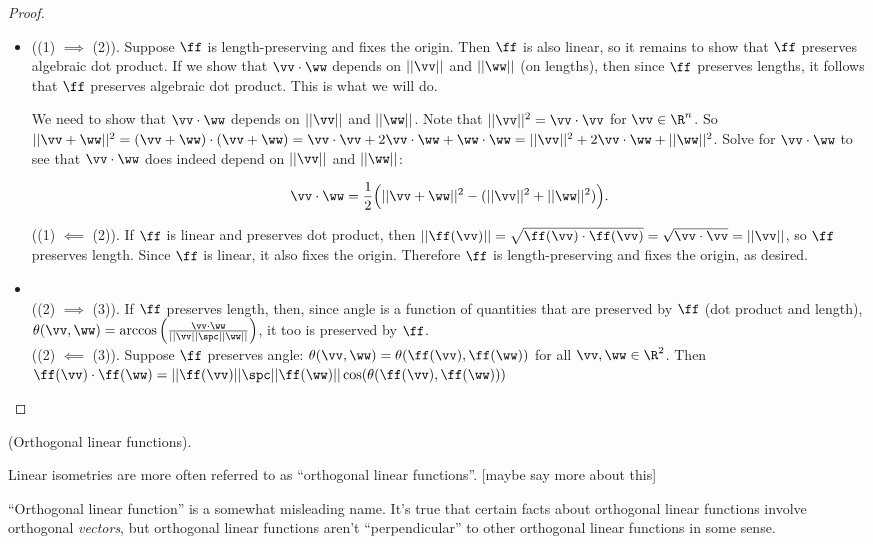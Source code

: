 \begin{proof}
    \mbox{} \\
    \begin{itemize}
        \item ((1) $\implies$ (2)). Suppose $\ff$ is length-preserving and fixes the origin. Then $\ff$ is also linear, so it remains to show that $\ff$ preserves algebraic dot product. If we show that $\vv \cdot \ww$ depends on $||\vv||$ and $||\ww||$ (on lengths), then since $\ff$ preserves lengths, it follows that $\ff$ preserves algebraic dot product. This is what we will do.

        We need to show that $\vv \cdot \ww$ depends on $||\vv||$ and $||\ww||$. Note that $||\vv||^2 = \vv \cdot \vv$ for $\vv \in \R^n$. So \\ $||\vv + \ww||^2 = (\vv + \ww) \cdot (\vv + \ww) = \vv \cdot \vv + 2 \vv \cdot \ww + \ww \cdot \ww = ||\vv||^2 + 2 \vv \cdot \ww + ||\ww||^2$. Solve for $\vv \cdot \ww$ to see that $\vv \cdot \ww$ does indeed depend on $||\vv||$ and $||\ww||$:
        
       \begin{align*}
            \vv \cdot \ww = \frac{1}{2}\Big(||\vv + \ww||^2 - (||\vv||^2 + ||\ww||^2) \Big).
        \end{align*}
        
        ((1) $\impliedby$ (2)). If $\ff$ is linear and preserves dot product, then $||\ff(\vv)|| = \sqrt{\ff(\vv) \cdot \ff(\vv)} = \sqrt{\vv \cdot \vv} = ||\vv||$, so $\ff$ preserves length. Since $\ff$ is linear, it also fixes the origin. Therefore $\ff$ is length-preserving and fixes the origin, as desired.
        
        \item \mbox{} \\
        ((2) $\implies$ (3)). If $\ff$ preserves length, then, since angle is a function of quantities that are preserved by $\ff$ (dot product and length), $\theta(\vv, \ww) = \arccos\Big( \frac{\vv \cdot \ww}{||\vv|| \spc ||\ww||} \Big)$, it too is preserved by $\ff$. \\
        
        ((2) $\impliedby$ (3)). Suppose $\ff$ preserves angle: $\theta(\vv, \ww) = \theta(\ff(\vv), \ff(\ww))$ for all $\vv, \ww \in \R^2$. Then $\ff(\vv) \cdot \ff(\ww) = ||\ff(\vv)|| \spc ||\ff(\ww)|| \cos(\theta(\ff(\vv), \ff(\ww)))$
    \end{itemize}
\end{proof}

\begin{remark}
    (Orthogonal linear functions).

    Linear isometries are more often referred to as ``orthogonal linear functions''. [maybe say more about this]
    
    ``Orthogonal linear function'' is a somewhat misleading name. It's true that certain facts about orthogonal linear functions involve orthogonal \textit{vectors}, but orthogonal linear functions aren't ``perpendicular'' to other orthogonal linear functions in some sense.
\end{remark}

